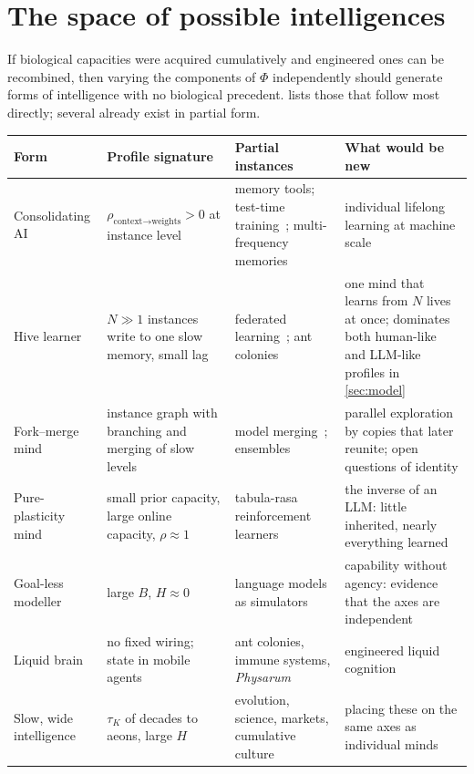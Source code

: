 \documentclass[11pt]{article}
\theoremstyle{plain}
\theoremstyle{definition}
\theoremstyle{remark}
\begin{document}
\section{The space of possible intelligences}
\label{sec:space}

If biological capacities were acquired cumulatively and engineered ones can be recombined, then varying the components of $\Phi$ independently should generate forms of intelligence with no biological precedent.  lists those that follow most directly; several already exist in partial form.

\begin{table}[t]
\centering
\small
\renewcommand{\arraystretch}{1.18}
\begin{tabularx}{\linewidth}{@{}>{\raggedright}p{2.6cm}>{\raggedright}p{3.6cm}>{\raggedright}p{3.4cm}>{\raggedright\arraybackslash}X@{}}
\toprule
Form & Profile signature & Partial instances & What would be new \\
\midrule
Consolidating AI & $\rho_{\text{context}\to\text{weights}}>0$ at instance level & memory tools; test-time training~\citep{sun2020test}; multi-frequency memories~\citep{behrouz2025titans,behrouz2025nested,tiwari2026fast} & individual lifelong learning at machine scale \\
Hive learner & $N\gg1$ instances write to one slow memory, small lag & federated learning~\citep{mcmahan2017communication}; ant colonies & one mind that learns from $N$ lives at once; dominates both human-like and LLM-like profiles in \cref{sec:model} \\
Fork--merge mind & instance graph with branching and merging of slow levels & model merging~\citep{wortsman2022model}; ensembles & parallel exploration by copies that later reunite; open questions of identity \\
Pure-plasticity mind & small prior capacity, large online capacity, $\rho\approx1$ & tabula-rasa reinforcement learners & the inverse of an LLM: little inherited, nearly everything learned \\
Goal-less modeller & large $B$, $H\approx0$ & language models as simulators~\citep{shanahan2023role} & capability without agency: evidence that the axes are independent~\citep{bostrom2012superintelligent} \\
Liquid brain & no fixed wiring; state in mobile agents & ant colonies, immune systems, \emph{Physarum}~\citep{sole2019liquid,nakagaki2000maze} & engineered liquid cognition \\
Slow, wide intelligence & $\tau_K$ of decades to aeons, large $H$ & evolution, science, markets, cumulative culture & placing these on the same axes as individual minds \\

\end{tabularx}
\end{table}
\end{document}

